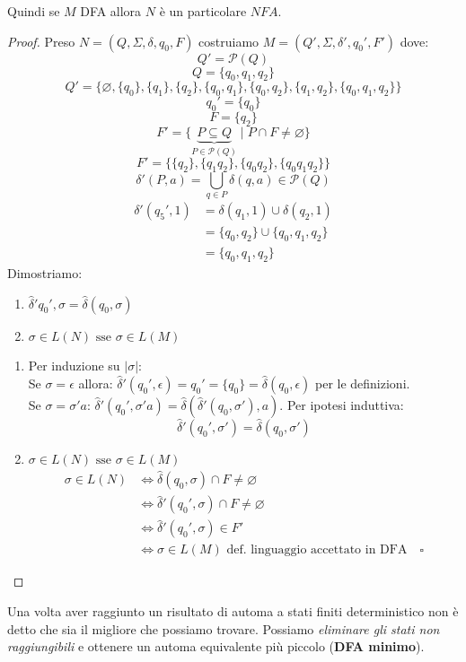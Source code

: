 \documentclass[a4paper]{article}
\begin{document}
    Quindi se $M$ DFA allora $N$ è un particolare $NFA$.
    \begin{proof}
        Preso $N = (Q, \Sigma, \delta, q_0, F)$ costruiamo $M = (Q', \Sigma, \delta', q_0', F')$ dove:
        \[Q' = \mathcal{P}(Q)\]
        \[Q = \{q_0, q_1, q_2\}\]
        \[Q' = \{\varnothing, 
        \{q_0\}, \{q_1\},
        \{q_2\}, \{q_0, q_1\}, \{q_0, q_2\},
        \{q_1, q_2\}, \{q_0, q_1, q_2\}\}\]
        \[q_0' = \{q_0\}\]
        \[F = \{q_2\}\]
        \[F' = \{\underbrace{P \subseteq Q}_{P \in \mathcal{P}(Q)} \; | \; P \cap F \neq \varnothing\}\]
        \[F' = \{\{q_2\}, \{q_1q_2\}, 
        \{q_0q_2\},\{q_0q_1q_2\}
        \}\]
        \[\delta'(P, a) = \bigcup_{q \in P} \delta(q, a) \in \mathcal{P}(Q)\]
        \[
        \begin{aligned}
            \delta'(q_5',1) &= \delta(q_1,1) \cup \delta(q_2,1)\\
            &= \{q_0, q_2\} \cup \{q_0, q_1, q_2\}\\
            &= \{q_0, q_1, q_2\}
        \end{aligned}
        \]
        Dimostriamo:
        \begin{enumerate}
            \item  $\hat{\delta}'{q_0', \sigma} = \hat{\delta}(q_0, \sigma)$ 
            \item $\sigma \in L(N) \text{ sse } \sigma \in L(M)$
        \end{enumerate}
        \begin{enumerate}
            \item Per induzione su $|\sigma|$:\\
            Se $\sigma = \epsilon$ allora: $\hat{\delta}'(q_0', \epsilon) = q_0' = \{q_0\} = \hat{\delta}(q_0, \epsilon)$ per le definizioni.\\
            Se $\sigma = \sigma'a$: $\hat{\delta}'({q_0', \sigma'a}) = \hat{\delta}(\hat{\delta}'(q_0, \sigma'), a)$. Per ipotesi induttiva:
            \[\hat{\delta}'(q_0', \sigma') = \hat{\delta}(q_0, \sigma')\]
            \item $\sigma \in L(N) \text{ sse } \sigma \in L(M)$
            \[
            \begin{aligned}
              \sigma \in L(N) &\Leftrightarrow \hat{\delta}(q_0, \sigma) \cap F \neq \varnothing\\
                &\Leftrightarrow \hat{\delta}'(q_0', \sigma) \cap F \neq \varnothing\\
                &\Leftrightarrow \hat{\delta}'(q_0', \sigma) \in F'\\
                &\Leftrightarrow \sigma \in L(M) \text{ def. linguaggio accettato in DFA}  \quad \square
            \end{aligned} 
            \]
        \end{enumerate}
    \end{proof}
\noindent
Una volta aver raggiunto un risultato di automa a stati finiti deterministico non è
detto che sia il migliore che possiamo trovare. Possiamo \textit{eliminare gli stati non raggiungibili} e ottenere un
automa equivalente più piccolo (\textbf{DFA minimo}).
\end{document}
